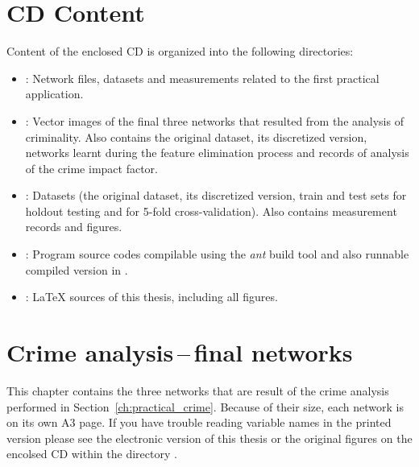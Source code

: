 \chapter{CD Content}\label{ch:appendix_cd_content}
Content of the enclosed CD is organized into the following directories:
\begin{itemize}
    \item {}: Network  files, datasets and measurements related to the first practical application.
    \item {}: Vector images of the final three networks that resulted from the analysis of criminality. Also contains the original dataset, its discretized version, networks learnt during the feature elimination process and records of analysis of the crime impact factor.
    \item {}: Datasets (the original dataset, its discretized version, train and test sets for holdout testing and for 5-fold cross-validation). Also contains measurement records and figures.
    \item {}: Program source codes compilable using the \emph{ant} build tool and also runnable compiled version in .
    \item {}:  {\LaTeX} sources of this thesis, including all figures.
\end{itemize} 





\chapter{Crime analysis\,--\,final networks}\label{ch:appendix_crime_net}
This chapter contains the three networks that are result of the crime analysis performed in Section~\ref{ch:practical_crime}. Because of their size, each network is on its own A3 page. If you have trouble reading variable names in the printed version please see the electronic version of this thesis or the original figures on the encolsed CD within the directory .


